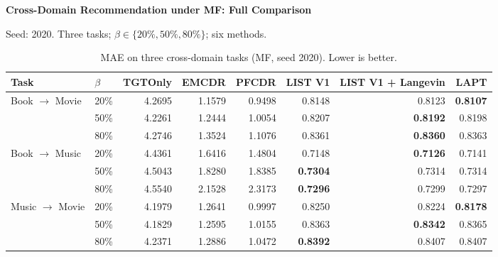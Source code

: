 \documentclass[10pt]{article}
\begin{document}
\begin{center}\large\textbf{Cross-Domain Recommendation under MF: Full Comparison}\end{center}
\noindent Seed: 2020. Three tasks; $\beta\in\{20\%,50\%,80\%\}$; six methods.\par\medskip
\begin{table}[htbp]
\centering
\caption{MAE on three cross-domain tasks (MF, seed 2020). Lower is better.}
\small
\setlength{\tabcolsep}{4pt}
\begin{tabular}{llrrrrrr}
\toprule
Task & $\beta$ & TGTOnly & EMCDR & PFCDR & LIST V1 & LIST V1 + Langevin & LAPT \\
\midrule
Book $\rightarrow$ Movie & 20\% & 4.2695 & 1.1579 & 0.9498 & 0.8148 & 0.8123 & \textbf{0.8107} \\
 & 50\% & 4.2261 & 1.2444 & 1.0054 & 0.8207 & \textbf{0.8192} & 0.8198 \\
 & 80\% & 4.2746 & 1.3524 & 1.1076 & 0.8361 & \textbf{0.8360} & 0.8363 \\
\midrule
Book $\rightarrow$ Music & 20\% & 4.4361 & 1.6416 & 1.4804 & 0.7148 & \textbf{0.7126} & 0.7141 \\
 & 50\% & 4.5043 & 1.8280 & 1.8385 & \textbf{0.7304} & 0.7314 & 0.7314 \\
 & 80\% & 4.5540 & 2.1528 & 2.3173 & \textbf{0.7296} & 0.7299 & 0.7297 \\
\midrule
Music $\rightarrow$ Movie & 20\% & 4.1979 & 1.2641 & 0.9997 & 0.8250 & 0.8224 & \textbf{0.8178} \\
 & 50\% & 4.1829 & 1.2595 & 1.0155 & 0.8363 & \textbf{0.8342} & 0.8365 \\
 & 80\% & 4.2371 & 1.2886 & 1.0472 & \textbf{0.8392} & 0.8407 & 0.8407 \\
\bottomrule
\end{tabular}
\end{table}
\end{document}
